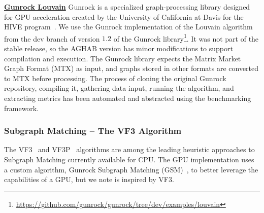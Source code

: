     \underline{\textbf{Gunrock Louvain}}
        Gunrock is a specialized graph-processing library designed for GPU acceleration created by the University of California at Davis for the HIVE program~\cite{Wang2016}. 
        We use the Gunrock implementation of the Louvain algorithm from the dev branch of version $1.2$ of the Gunrock library\footnote{\url{https://github.com/gunrock/gunrock/tree/dev/examples/louvain}}. It was not part of the stable release, so the AGHAB version has minor modifications to support compilation and execution. 
        The Gunrock library expects the Matrix Market Graph Format (MTX) as input, and graphs stored in other formats are converted to MTX before processing.  
        The process of cloning the original Gunrock repository, compiling it, gathering data input, running the algorithm, and extracting metrics has been automated and abstracted using the benchmarking framework.

\subsubsection{Subgraph Matching -- The VF3 Algorithm}
    The VF3~\cite{Carletti2017} and VF3P~\cite{Carletti2019} algorithms are among the leading heuristic approaches to Subgraph Matching currently available for CPU. 
    The GPU implementation uses a custom algorithm, Gunrock Subgraph Matching (GSM)~\cite{Wang2016}, to better leverage the capabilities of a GPU, but we note is inspired by VF3.


